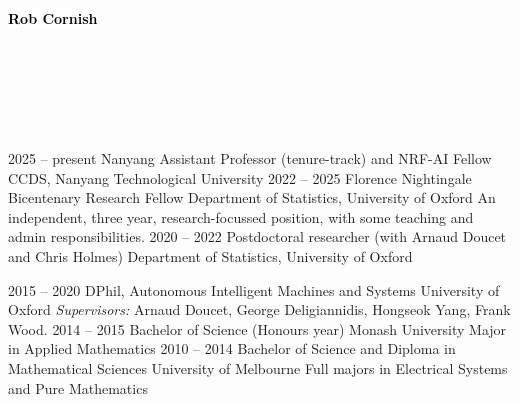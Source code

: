 \documentclass[9pt]{developercv}
\begin{document}
\begin{minipage}[t]{0.45\textwidth}
    \vspace{-\baselineskip}
    \colorbox{white}{{\HUGE\textcolor{black}{\textbf{{Rob Cornish}}}}}
    \vspace{6pt}
\end{minipage}
\begin{minipage}[t]{0.275\textwidth}
    \vspace{-\baselineskip}
    \\
    \\
\end{minipage}
\begin{minipage}[t]{0.275\textwidth}
    \vspace{-\baselineskip}
    \\
    \\
\end{minipage}

\vspace{-0.5cm}

\begin{entrylist}
    \entry
    {2025 -- present}
    {Nanyang Assistant Professor (tenure-track) and NRF-AI Fellow}
    {CCDS, Nanyang Technological University}
    {}
    \entry
    {2022 -- 2025}
    {Florence Nightingale Bicentenary Research Fellow}
    {Department of Statistics, University of Oxford}
    {An independent, three year, research-focussed position, with some teaching and admin responsibilities.}
    \entry
    {2020 -- 2022}
    {Postdoctoral researcher (with Arnaud Doucet and Chris Holmes)}
    {Department of Statistics, University of Oxford}
    {}
\end{entrylist}

\vspace{-2.5em}

\begin{entrylist}
  \entry
    {2015 -- 2020}
    {DPhil, Autonomous Intelligent Machines and Systems}
    {University of Oxford}
    {\textit{Supervisors:} Arnaud Doucet, George Deligiannidis, Hongseok Yang, Frank Wood.}
  \entry
    {2014 -- 2015}
    {Bachelor of Science (Honours year)}
    {Monash University}
    {Major in Applied Mathematics}
  \entry
    {2010 -- 2014}
    {Bachelor of Science and Diploma in Mathematical Sciences}
    {University of Melbourne}
    {Full majors in Electrical Systems and Pure Mathematics}
\end{entrylist}
\end{document}
